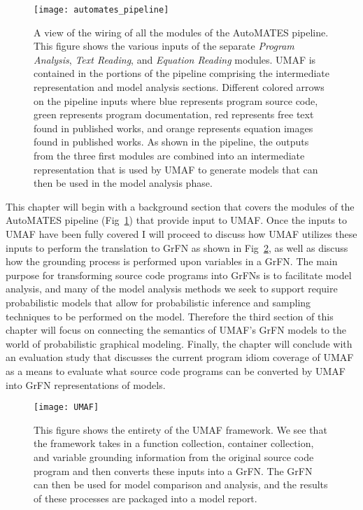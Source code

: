 \begin{figure}[!htbp]
    \centering
    \texttt{[image: automates\_pipeline]}%
    \caption[The AutoMATES Pipeline]{A view of the wiring of all the modules of the AutoMATES pipeline. This figure shows the various inputs of the separate \textit{Program Analysis}, \textit{Text Reading}, and \textit{Equation Reading} modules. UMAF is contained in the portions of the pipeline comprising the intermediate representation and model analysis sections. Different colored arrows on the pipeline inputs where blue represents program source code, green represents program documentation, red represents free text found in published works, and orange represents equation images found in published works. As shown in the pipeline, the outputs from the three first modules are combined into an intermediate representation that is used by UMAF to generate models that can then be used in the model analysis phase.}
    \label{fig:automates_pipeline}
\end{figure}

This chapter will begin with a background section that covers the modules of the AutoMATES pipeline (Fig~\ref{fig:automates_pipeline}) that provide input to UMAF.
Once the inputs to UMAF have been fully covered I will proceed to discuss how UMAF utilizes these inputs to perform the translation to GrFN as shown in Fig~\ref{fig:umaf_diagram}, as well as discuss how the grounding process is performed upon variables in a GrFN.
The main purpose for transforming source code programs into GrFNs is to facilitate model analysis, and many of the model analysis methods we seek to support require probabilistic models that allow for probabilistic inference and sampling techniques to be performed on the model.
Therefore the third section of this chapter will focus on connecting the semantics of UMAF's GrFN models to the world of probabilistic graphical modeling.
Finally, the chapter will conclude with an evaluation study that discusses the current program idiom coverage of UMAF as a means to evaluate what source code programs can be converted by UMAF into GrFN representations of models.

\begin{figure}[!htbp]
    \centering
    \texttt{[image: UMAF]}%
    \caption[Diagram of UMAF]{This figure shows the entirety of the UMAF framework. We see that the framework takes in a function collection, container collection, and variable grounding information from the original source code program and then converts these inputs into a GrFN. The GrFN can then be used for model comparison and analysis, and the results of these processes are packaged into a model report.}
    \label{fig:umaf_diagram}
\end{figure}

